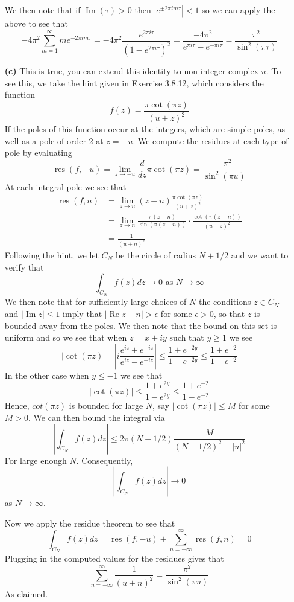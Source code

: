 \documentclass{article}
\newcommand{\res}{\operatorname{res}}
\newcommand{\real}{\mathrel{\text{Re}}}
\newcommand{\imag}{\mathrel{\text{Im}}}
\begin{document}
\begin{enumerate}
\[  \]
  We then note that if $\imag(\tau) > 0$ then $|e^{\pm 2\pi im\tau}| <
  1$ so we can apply the above to see that
  \[
  -4\pi^2\sum_{m=1}^\infty me^{-2\pi im\tau} = -4\pi^2\frac{e^{2\pi
      i\tau}}{(1-e^{2\pi i\tau})^2} = \frac{-4\pi^2}{e^{\pi i\tau} -
    e^{-\pi i\tau}} = \frac{\pi^2}{\sin^2(\pi\tau)}
  \]
\item[\textbf{(c)}] This is true, you can extend this identity to
  non-integer complex $u$. To see this, we take the hint given in
  Exercise 3.8.12, which considers the function
  \[
  f(z) = \frac{\pi \cot(\pi z)}{(u+z)^2}
  \]
  If the poles of this function occur at the integers, which are
  simple poles, as well as a pole of order 2 at $z = -u$. We compute
  the residues at each type of pole by evaluating
  \[
  \res(f,-u) = \lim_{z\to -u} \frac{d}{dz}\pi\cot(\pi z) =
  \frac{-\pi^2}{\sin^2(\pi u)}
  \]
  At each integral pole we see that
  \begin{align*}
    \res(f,n) &= \lim_{z\to n}(z-n)\frac{\pi\cot(\pi z)}{(u+z)^2} \\
    &= \lim_{z\to n} \frac{\pi(z-n)}{\sin(\pi(z-n))}\cdot
    \frac{\cot(\pi(z-n))}{(u+z)^2} \\
    &= \frac{1}{(u+n)^2}
  \end{align*}
  Following the hint, we let $C_N$ be the circle of radius $N + 1/2$
  and we want to verify that
  \[
  \int_{C_N} f(z)dz \to 0 \text{ as } N \to \infty
  \]
  We then note that for sufficiently large choices of $N$ the
  conditions $z \in C_N$ and $|\imag z| \leq 1$ imply that $|\real z -
  n| > \epsilon$ for some $\epsilon > 0$, so that $z$ is bounded away
  from the poles. We then note that the bound on this set is uniform
  and so we see that when $z = x + iy$ such that $y \geq 1$ we see
  \[
  |\cot (\pi z) = \left| i\frac{e^{iz}+e^{-iz}}{e^{iz}-e^{-iz}} \right|\leq
    \frac{1 + e^{-2y}}{1-e^{-2y}} \leq \frac{1 + e^{-2}}{1-e^{-2}}
  \]
  In the other case when $y \leq -1$ we see that
  \[
  |\cot (\pi z)| \leq \frac{1+e^{2y}}{1-e^{2y}}\leq
  \frac{1+e^{-2}}{1-e^{-2}}
  \]
  Hence, $cot(\pi z)$ is bounded for large $N$, say $|\cot(\pi z)|
  \leq M$ for some $M > 0$. We can then bound the integral via
  \[
  \left|\int_{C_N} f(z)dz\right| \leq 2\pi(N + 1/2)\frac{M}{(N+ 1/2)^2 - |u|^2}
  \]
  For large enough $N$. Consequently,
  \[
  \left|\int_{C_N} f(z)dz\right| \to 0
  \]
  as $N \to \infty$.

  Now we apply the residue theorem to see that
  \[
  \int_{C_N} f(z)dz = \res(f,-u) + \sum_{n=-\infty}^\infty \res(f,n) = 0
  \]
  Plugging in the computed values for the residues gives that
  \[
  \sum_{n=-\infty}^\infty \frac{1}{(u+n)^2} = \frac{\pi^2}{\sin^2(\pi u)}
  \]
  As claimed.
\end{enumerate}
\end{document}
